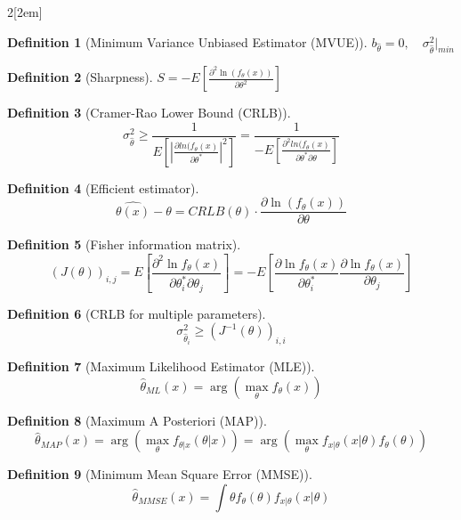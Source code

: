 \documentclass[leqno]{article}
\newtheorem*{definition}{Definition}
\begin{document}
\begin{multicols}{2}[\columnsep2em]
\begin{definition}[Minimum Variance Unbiased Estimator (MVUE)]
$b_{\hat{\theta }}=0, \quad \sigma_{\hat{\theta }}^2|_{min}$
\end{definition}

\begin{definition}[Sharpness] $\displaystyle S = -E\left[\frac{\partial^2 \ln (f_{\theta }(x))}{\partial \theta ^2}\right]$
\end{definition}

\begin{definition}[Cramer-Rao Lower Bound (CRLB)]
\[
\sigma ^2_{\hat{\theta }} \ge \frac{1}{E\left[ \left| \frac{\partial ln (f_\theta (x)}{\partial \theta^* } \right|^2  \right]} = \frac{1}{-E\left[ \frac{\partial^2 ln (f_\theta (x)}{\partial \theta^* \partial\theta }  \right]}
\] 
\end{definition}

\begin{definition}[Efficient estimator]
\[
\hat{\theta (x)}-\theta = CRLB(\theta )\cdot \frac{\partial \ln (f_\theta (x))}{\partial \theta } 
\] 
\end{definition}

\begin{definition}[Fisher information matrix]
\[
  (J(\theta ))_{i, j} = E \left[ \frac{\partial^2 \ln f_\theta (x)}{\partial \theta^* _i \partial\theta _j} \right] = -E \left[ \frac{\partial \ln f_\theta (x)}{\partial \theta^* _i} \frac{\partial \ln f_\theta (x)}{\partial\theta _j} \right]
\] 
\end{definition}

\begin{definition}[CRLB for multiple parameters] 
\[
  \sigma ^2_{\hat{\theta}_{i}}\ge (J^{-1}(\theta ))_{i, i}
\] 
\end{definition}

\begin{definition}[Maximum Likelihood Estimator (MLE)]
\[
\hat{\theta }_{ML}(x) = \arg (\max_{\theta }f_\theta (x))
\] 
\end{definition}

\begin{definition}[Maximum A Posteriori (MAP)]
\[
\hat{\theta }_{MAP}(x) = \arg (\max_{\theta }f_{\theta |x}(\theta |x))= \arg (\max_{\theta } f_{x|\theta }(x|\theta )f_\theta (\theta ))
\] 
\end{definition}

\begin{definition}[Minimum Mean Square Error (MMSE)]
\[
\hat{\theta }_{MMSE}(x) = \int \theta f_\theta (\theta ) f_{x|\theta }(x|\theta )
\] 
\end{definition}





\end{multicols}
\end{document}
